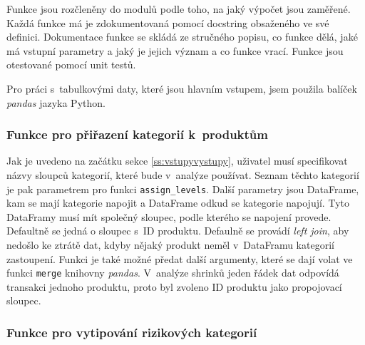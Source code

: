 Funkce jsou rozčleněny do modulů podle toho, na jaký výpočet jsou zaměřené. Každá funkce má je zdokumentovaná pomocí docstring obsaženého ve své definici. Dokumentace funkce se skládá ze stručného popisu, co funkce dělá, jaké má vstupní parametry a jaký je jejich význam a co funkce vrací. Funkce jsou otestované pomocí unit testů.

Pro práci s~tabulkovými daty, které jsou hlavním vstupem, jsem použila balíček \emph{pandas} jazyka Python.



\subsubsection*{Funkce pro přiřazení kategorií k~produktům}

Jak je uvedeno na začátku sekce \ref*{ss:vstupyvystupy}, uživatel musí specifikovat názvy sloupců kategorií, které bude v~analýze používat. Seznam těchto kategorií je pak parametrem pro funkci \texttt{assign\_levels}. Další parametry jsou DataFrame, kam se mají kategorie napojit a DataFrame odkud se kategorie napojují. Tyto DataFramy musí mít společný sloupec, podle kterého se napojení provede. Defaultně se jedná o sloupec s~ID produktu. Defaulně se provádí \emph{left join}, aby nedošlo ke ztrátě dat, kdyby nějaký produkt neměl v~DataFramu kategorií zastoupení. Funkci je také možné předat další argumenty, které se dají volat ve funkci \texttt{merge} knihovny \emph{pandas}. V~analýze shrinků jeden řádek dat odpovídá transakci jednoho produktu, proto byl zvoleno ID produktu jako propojovací sloupec.

\subsubsection*{Funkce pro vytipování rizikových kategorií}

